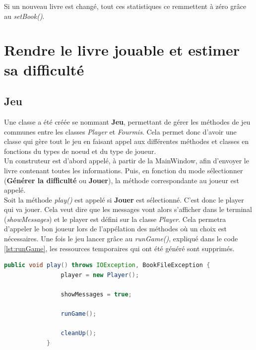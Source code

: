 		Si un nouveau livre est changé, tout ces statistiques ce remmettent à zéro grâce au \textit{setBook()}.



	\section{Rendre le livre jouable et estimer sa difficulté}\label{sec:Jeu}
		\subsection{Jeu}
		Une classe a été créée se nommant \textbf{Jeu}, permettant de gérer les méthodes de jeu communes entre les classes \textit{Player} et \textit{Fourmis}. Cela permet donc d'avoir une classe qui gère tout le jeu en faisant appel aux différentes méthodes et classes en fonctions du types de noeud et du type de joueur. \\
		Un construteur est d'abord appelé, à partir de la MainWindow, afin d'envoyer le livre contenant toutes les informations. Puis, en fonction du mode sélectionner (\textbf{Générer la difficulté} ou \textbf{Jouer}), la méthode correspondante au joueur est appelé.\\

		Soit la méthode \textit{play()} est appelé si \textbf{Jouer} est sélectionné. C'est donc le player qui va jouer. Cela veut dire que les messages vont alors s'afficher dans le terminal (\textit{showMessages}) et le player est défini sur la classe \textit{Player}. Cela permetra d'appeler le bon joueur lors de l'appélation des méthodes où un choix est nécessaires.
		Une fois le jeu lancer grâce au \textit{runGame()}, expliqué dans le code \ref{lst:runGame}, les ressources temporaires qui ont été généré sont supprimés.

		\begin{lstlisting}[language=java, caption=play()]
			public void play() throws IOException, BookFileException {
				player = new Player();

				showMessages = true;

				runGame();

				cleanUp();
			}
		\end{lstlisting}

